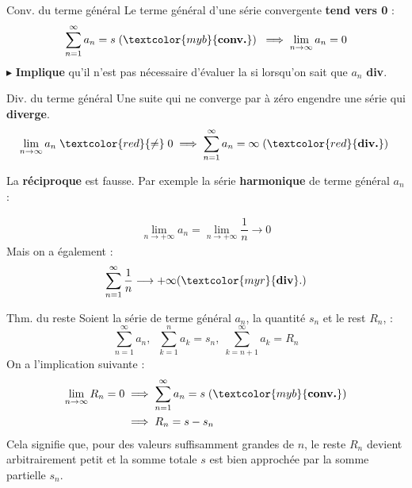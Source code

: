 \documentclass{report}
\begin{document}
\begin{multicols*}{3}
    \begin{theorem}{Conv. du terme général}{}
        Le terme général d'une série convergente \textbf{tend vers 0} : 
        $$%
        \sum_{n=1}^{\infty }a_n = s \; (\textcolor{myb}{\textbf{conv.}}) \;\implies \lim\limits_{n\to \infty} a_n = 0 
        $$%
        $\blacktriangleright$ \textbf{Implique} qu'il n'est pas 
        nécessaire d'évaluer la si lorsqu'on sait que 
        $a_n$ \textbf{div}.   
    \end{theorem}           


    \begin{corollary}{Div. du terme général}{}
        Une suite qui ne converge par à zéro engendre une série qui \textbf{diverge}.        
        $$%
        \lim\limits_{n\to \infty} a_n \; \textcolor{red}{\neq} \; 0 \implies   
        \sum_{n=1}^{\infty }a_n = \infty \; (\textcolor{red}{\textbf{div.}}) \;        $$%
    \end{corollary}


    \begin{note}{}{}
       La \textbf{réciproque } est fausse. Par exemple la série 
       \textbf{harmonique} de terme général $a_n$  : 

       \begin{align*}
            \lim\limits_{n \to+\infty }a_n = 
            \lim\limits_{n \to+\infty } \dfrac{1}{n} 
            \longrightarrow 0
       \end{align*}
       Mais on a également  : 
       \begin{align*}
            \sum_{n=1}^{\infty }\dfrac{1}{n} \longrightarrow 
            + \infty (\textcolor{myr}{\textbf{div}}.  )
       \end{align*}
    \end{note}

    \begin{theorem}{Thm. du reste}{}
        Soient la série de terme général $a_n$, la quantité $s_n$ et le rest $R_n$, :
        \[%
        \sum_{n=1}^{\infty }a_n, \;\;\sum_{k=1}^{n }a_k = s_n, \; \sum_{k= n+1}^{\infty }a_k = R_n
        \]%
        On a l'implication suivante :
        \begin{align*}
            \lim\limits_{n\to\infty }R_n = 0 
            &\implies \sum_{n=1}^{\infty }a_n = s \; (\textcolor{myb}{\textbf{conv.}})  \\
            &\implies R_n = s - s_n 
        \end{align*}
        Cela signifie que, pour des valeurs suffisamment grandes de \(n\), le reste \(R_n\) devient 
        arbitrairement petit et la somme totale \(s\) est bien approchée par la somme partielle 
        \(s_n\).    
    \end{theorem}   


\end{multicols*}
\end{document}
